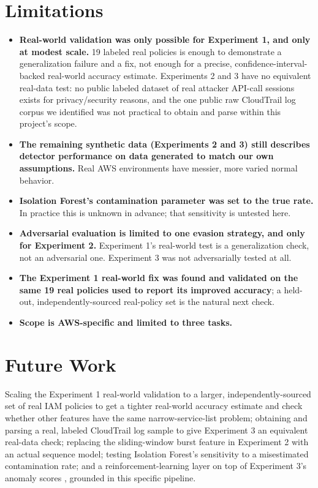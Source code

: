 \documentclass[11pt,a4paper]{article}
\begin{document}
\section{Limitations}

\begin{itemize}
\item \textbf{Real-world validation was only possible for Experiment 1, and only at modest scale.} 19 labeled real policies is enough to demonstrate a generalization failure and a fix, not enough for a precise, confidence-interval-backed real-world accuracy estimate. Experiments 2 and 3 have no equivalent real-data test: no public labeled dataset of real attacker API-call sessions exists for privacy/security reasons, and the one public raw CloudTrail log corpus we identified was not practical to obtain and parse within this project's scope.
\item \textbf{The remaining synthetic data (Experiments 2 and 3) still describes detector performance on data generated to match our own assumptions.} Real AWS environments have messier, more varied normal behavior.
\item \textbf{Isolation Forest's contamination parameter was set to the true rate.} In practice this is unknown in advance; that sensitivity is untested here.
\item \textbf{Adversarial evaluation is limited to one evasion strategy, and only for Experiment 2.} Experiment 1's real-world test is a generalization check, not an adversarial one. Experiment 3 was not adversarially tested at all.
\item \textbf{The Experiment 1 real-world fix was found and validated on the same 19 real policies used to report its improved accuracy}; a held-out, independently-sourced real-policy set is the natural next check.
\item \textbf{Scope is AWS-specific and limited to three tasks.}
\end{itemize}

\section{Future Work}

Scaling the Experiment 1 real-world validation to a larger, independently-sourced set of real IAM policies to get a tighter real-world accuracy estimate and check whether other features have the same narrow-service-list problem; obtaining and parsing a real, labeled CloudTrail log sample to give Experiment 3 an equivalent real-data check; replacing the sliding-window burst feature in Experiment 2 with an actual sequence model; testing Isolation Forest's sensitivity to a misestimated contamination rate; and a reinforcement-learning layer on top of Experiment 3's anomaly scores \cite{rlsecurity2025,rlincident2025}, grounded in this specific pipeline.
\end{document}
